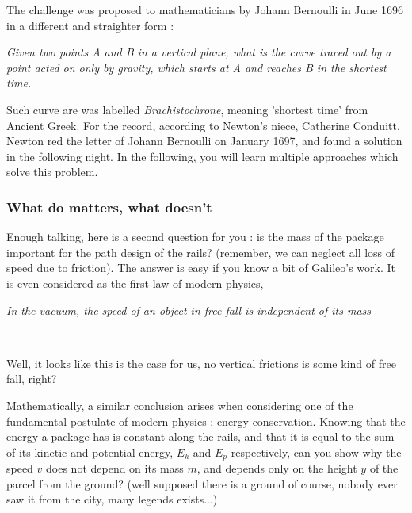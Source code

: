 \documentclass{article}
\begin{document}
The challenge was proposed to mathematicians by Johann Bernoulli in June 1696 in a different and straighter form :
\begin{center}
  \textit{Given two points A and B in a vertical plane, what is the curve traced out by a point acted on only by gravity, which starts at A and reaches B in the shortest time.}
\end{center}
Such curve are was labelled \textit{Brachistochrone}, meaning 'shortest time' from Ancient Greek. For the record, according to Newton's niece, Catherine Conduitt, Newton red the letter of Johann Bernoulli on January 1697, and found a solution in the following night. In the following, you will learn multiple approaches which solve this problem.




\subsubsection*{What do matters, what doesn't}

Enough talking, here is a second question for you : is the mass of the package important for the path design of the rails? (remember, we can neglect all loss of speed due to friction). The answer is easy if you know a bit of Galileo's work. It is even considered as the first law of modern physics,\\

\begin{tcolorbox}
\begin{center}
  \textit{In the vacuum, the speed of an object in free fall is independent of its mass}
\end{center}
\end{tcolorbox}
~

Well, it looks like this is the case for us, no vertical frictions is some kind of free fall, right?

Mathematically, a similar conclusion arises when considering one of the fundamental postulate of modern physics : energy conservation. Knowing that the energy a package has is constant along the rails, and that it is equal to the sum of its kinetic and potential energy, $E_k$ and $E_p$ respectively, can you show why the speed $v$ does not depend on its mass $m$, and depends only on the height $y$ of the parcel from the ground? (well supposed there is a ground of course, nobody ever saw it from the city, many legends exists...)
\end{document}
